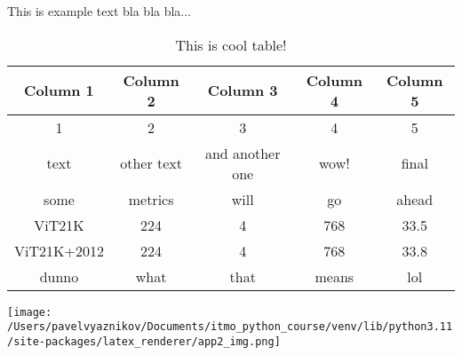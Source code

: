 \documentclass{article}
\begin{document}
This is example text bla bla bla...
\begin{table}[t]
\centering
\begin{tabular}{c c c c c}
\toprule
Column 1&Column 2&Column 3&Column 4&Column 5 \\
\midrule
1&2&3&4&5 \\
text&other text&and another one&wow!&final \\
some&metrics&will&go&ahead \\
ViT21K&224&4&768&33.5 \\
ViT21K+2012&224&4&768&33.8 \\
dunno&what&that&means&lol \\
\hline
\end{tabular}
\caption{This is cool table!}
\end{table}
\begin{center}
\texttt{[image: /Users/pavelvyaznikov/Documents/itmo\_python\_course/venv/lib/python3.11/site-packages/latex\_renderer/app2\_img.png]}
\end{center}
\end{document}
